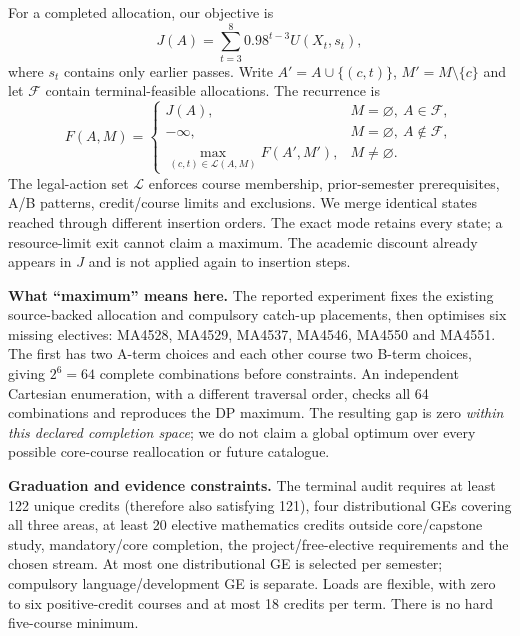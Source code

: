\documentclass{article}
\begin{document}
For a completed allocation, our objective is
\begin{equation}
J(A)=\sum_{t=3}^{8}0.98^{t-3}U(X_t,s_t),\label{eq:pathobjective}
\end{equation}
where $s_t$ contains only earlier passes. Write $A'=A\cup\{(c,t)\}$, $M'=M\setminus\{c\}$ and let $\mathcal F$ contain terminal-feasible allocations. The recurrence is
\begin{equation}
F(A,M)=\begin{cases}
J(A),&M=\varnothing,\ A\in\mathcal F,\\
-\infty,&M=\varnothing,\ A\notin\mathcal F,\\
\max_{(c,t)\in\mathcal L(A,M)}F(A',M'),&M\ne\varnothing.
\end{cases}\label{eq:bellman}
\end{equation}
The legal-action set $\mathcal L$ enforces course membership, prior-semester prerequisites, A/B patterns, credit/course limits and exclusions. We merge identical states reached through different insertion orders. The exact mode retains every state; a resource-limit exit cannot claim a maximum. The academic discount already appears in $J$ and is not applied again to insertion steps.

\textbf{What ``maximum'' means here.} The reported experiment fixes the existing source-backed allocation and compulsory catch-up placements, then optimises six missing electives: MA4528, MA4529, MA4537, MA4546, MA4550 and MA4551. The first has two A-term choices and each other course two B-term choices, giving $2^6=64$ complete combinations before constraints. An independent Cartesian enumeration, with a different traversal order, checks all 64 combinations and reproduces the DP maximum. The resulting gap is zero \emph{within this declared completion space}; we do not claim a global optimum over every possible core-course reallocation or future catalogue.

\textbf{Graduation and evidence constraints.} The terminal audit requires at least 122 unique credits (therefore also satisfying 121), four distributional GEs covering all three areas, at least 20 elective mathematics credits outside core/capstone study, mandatory/core completion, the project/free-elective requirements and the chosen stream. At most one distributional GE is selected per semester; compulsory language/development GE is separate. Loads are flexible, with zero to six positive-credit courses and at most 18 credits per term. There is no hard five-course minimum.
\end{document}
